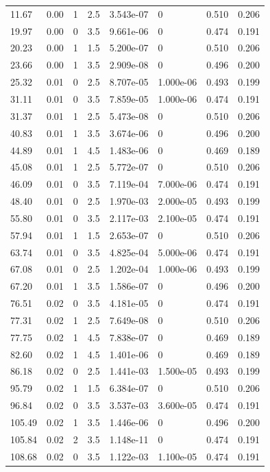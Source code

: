 \documentclass[preview]{standalone}
\begin{document}
{{\begin{tabular}{L{1.2cm}C{1.2cm} C{0.3cm}C{0.5cm} C{1.4cm}C{1.4cm} C{1.4cm}C{1.4cm}}
  11.67  &  0.00  & 1     & 2.5 &  3.543e-07  & 0  & 0.510 &  0.206   \\ 
  19.97  &  0.00  & 0     & 3.5 &  9.661e-06  & 0  & 0.474 &  0.191   \\ 
  20.23  &  0.00  & 1     & 1.5 &  5.200e-07  & 0  & 0.510 &  0.206   \\ 
  23.66  &  0.00  & 1     & 3.5 &  2.909e-08  & 0  & 0.496 &  0.200   \\ 
  25.32  &  0.01  & 0     & 2.5 &  8.707e-05  & 1.000e-06  & 0.493 &  0.199   \\ 
  31.11  &  0.01  & 0     & 3.5 &  7.859e-05  & 1.000e-06  & 0.474 &  0.191   \\ 
  31.37  &  0.01  & 1     & 2.5 &  5.473e-08  & 0  & 0.510 &  0.206   \\ 
  40.83  &  0.01  & 1     & 3.5 &  3.674e-06  & 0  & 0.496 &  0.200   \\ 
  44.89  &  0.01  & 1     & 4.5 &  1.483e-06  & 0  & 0.469 &  0.189   \\ 
  45.08  &  0.01  & 1     & 2.5 &  5.772e-07  & 0  & 0.510 &  0.206   \\ 
  46.09  &  0.01  & 0     & 3.5 &  7.119e-04  & 7.000e-06  & 0.474 &  0.191   \\ 
  48.40  &  0.01  & 0     & 2.5 &  1.970e-03  & 2.000e-05  & 0.493 &  0.199   \\ 
  55.80  &  0.01  & 0     & 3.5 &  2.117e-03  & 2.100e-05  & 0.474 &  0.191   \\ 
  57.94  &  0.01  & 1     & 1.5 &  2.653e-07  & 0  & 0.510 &  0.206   \\ 
  63.74  &  0.01  & 0     & 3.5 &  4.825e-04  & 5.000e-06  & 0.474 &  0.191   \\ 
  67.08  &  0.01  & 0     & 2.5 &  1.202e-04  & 1.000e-06  & 0.493 &  0.199   \\ 
  67.20  &  0.01  & 1     & 3.5 &  1.586e-07  & 0  & 0.496 &  0.200   \\ 
  76.51  &  0.02  & 0     & 3.5 &  4.181e-05  & 0  & 0.474 &  0.191   \\ 
  77.31  &  0.02  & 1     & 2.5 &  7.649e-08  & 0  & 0.510 &  0.206   \\ 
  77.75  &  0.02  & 1     & 4.5 &  7.838e-07  & 0  & 0.469 &  0.189   \\ 
  82.60  &  0.02  & 1     & 4.5 &  1.401e-06  & 0  & 0.469 &  0.189   \\ 
  86.18  &  0.02  & 0     & 2.5 &  1.441e-03  & 1.500e-05  & 0.493 &  0.199   \\ 
  95.79  &  0.02  & 1     & 1.5 &  6.384e-07  & 0  & 0.510 &  0.206   \\ 
  96.84  &  0.02  & 0     & 3.5 &  3.537e-03  & 3.600e-05  & 0.474 &  0.191   \\ 
  105.49  &  0.02  & 1     & 3.5 &  1.446e-06  & 0  & 0.496 &  0.200   \\ 
  105.84  &  0.02  & 2     & 3.5 &  1.148e-11  & 0  & 0.474 &  0.191   \\ 
  108.68  &  0.02  & 0     & 3.5 &  1.122e-03  & 1.100e-05  & 0.474 &  0.191   \\ 
\hline 
\end{tabular} 

}}
\end{document}
